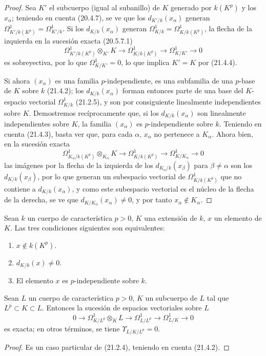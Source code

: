 \begin{proof}
Sea $K'$ el subcuerpo (igual al subanillo) de $K$ generado por
$k(K^p)$ y los $x_\alpha$; teniendo en cuenta (20.4.7), se ve que los
$d_{K'/k}(x_\alpha)$ generan $\Omega^1_{K'/k(K^p)}=\Omega^1_{K'/k}$. Si los
$d_{K/k}(x_\alpha)$ generan $\Omega^1_{K/k}=\Omega^1_{K/k(K^p)}$, la flecha de
la izquierda en la sucesión exacta (20.5.7.1)
\[
\Omega^1_{K'/k(K^p)}\otimes_{K'}K\to\Omega^1_{K/k(K^p)}\to\Omega^1_{K/K'}\to0
\]
es sobreyectiva, por lo que $\Omega^1_{K/K'}=0$, lo que implica $K'=K$ por (21.4.4).

Si ahora $(x_\alpha)$ es una familia $p$-independiente, es una subfamilia
de una $p$-base de $K$ sobre $k$ (21.4.2); los $d_{K/k}(x_\alpha)$ forman entonces
parte de una base del $K$-espacio vectorial $\Omega^1_{K/k}$ (21.2.5), y son
por consiguiente linealmente independientes sobre $K$. Demostremos recíprocamente que, si los
$d_{K/k}(x_\alpha)$ son linealmente independientes sobre $K$, la familia
$(x_\alpha)$ es $p$-independiente sobre $k$.
Teniendo en cuenta (21.4.3), basta ver que,
para cada $\alpha$, $x_\alpha$ no pertenece a $K_\alpha$. Ahora bien, en la
sucesión exacta
\[
\Omega^1_{K_\alpha/k(K^p)}\otimes_{K_\alpha}K\longrightarrow
\Omega^1_{K/k(K^p)}\longrightarrow\Omega^1_{K/K_\alpha}\longrightarrow0
\]
las imágenes por la flecha de la izquierda de los $d_{K_\alpha/k}(x_\beta)$ para
$\beta\neq\alpha$ son los $d_{K/k}(x_\beta)$, por lo que generan un subespacio
vectorial de $\Omega^1_{K/k(K^p)}$ que no contiene a $d_{K/k}(x_\alpha)$, y como
este subespacio vectorial es el núcleo de la flecha de la derecha, se ve que
$d_{K/K_\alpha}(x_\alpha)\neq0$, y por tanto $x_\alpha\notin K_\alpha$.
\end{proof}

\begin{corollary}[21.4.6]
\label{0.21.4.6-fr}
Sean $k$ un cuerpo de característica $p>0$, $K$ una extensión de $k$,
$x$ un elemento de $K$. Las tres condiciones siguientes son equivalentes:
\begin{enumerate}
  \item[\textup{a)}] $x\notin k(K^p)$.
  \item[\textup{b)}] $d_{K/k}(x)\neq0$.
  \item[\textup{c)}] El elemento $x$ es $p$-independiente sobre $k$.
\end{enumerate}
\end{corollary}

\begin{proposition}[21.4.7]
\label{0.21.4.7-fr}
Sean $L$ un cuerpo de característica $p>0$, $K$ un subcuerpo de $L$ tal
que $L^p\subset K\subset L$. Entonces la sucesión de espacios vectoriales sobre $L$
\begin{equation}
\tag{21.4.7.1}\label{0.21.4.7.1-fr}
0\to\Omega^1_{K/L^p}\otimes_KL\to\Omega^1_{L/L^p}
\to\Omega^1_{L/K}\to0
\end{equation}
es exacta; en otros términos, se tiene $\Upsilon_{L/K/L^p}=0$.
\end{proposition}
\begin{proof}
Es un caso particular de (21.2.4), teniendo en cuenta (21.4.2).
\end{proof}

